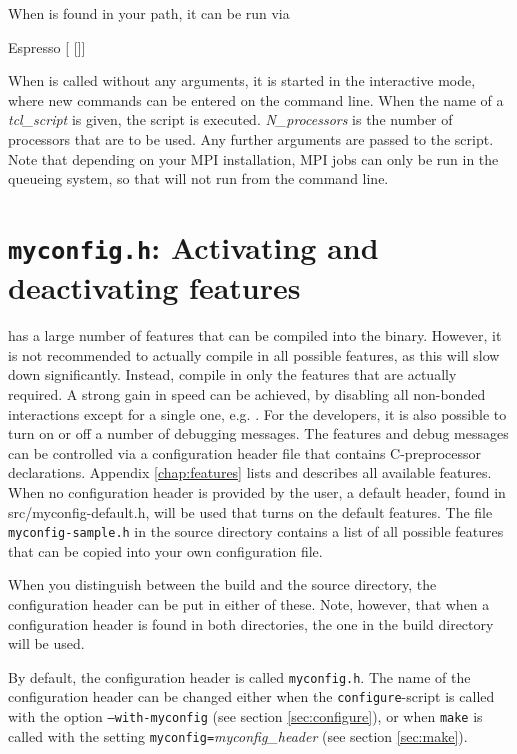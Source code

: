 When \es is found in your path, it can be run via
\begin{code}
Espresso [ []]
\end{code}

 When \es{} is called without any arguments,
it is started in the interactive mode, where new commands can be
entered on the command line. When the name of a \textit{tcl\_script}
is given, the script is executed. \textit{N\_processors} is the number
of processors that are to be used. Any further arguments are passed to
the script. Note that depending on your MPI installation, MPI jobs can
only be run in the queueing system, so that \es will not run from
the command line.


\section{\texttt{myconfig.h}: Activating and deactivating features}
\label{sec:myconfig}

   \es
has a large number of features that can be compiled into the binary.
However, it is not recommended to actually compile in all possible
features, as this will slow down \es significantly.  Instead, compile
in only the features that are actually required.  A strong gain in
speed can be achieved, by disabling all non-bonded interactions except
for a single one, e.g. .  For the developers,
it is also possible to turn on or off a number of debugging messages.
The features and debug messages can be controlled via a configuration
header file that contains C-preprocessor declarations. Appendix
\vref{chap:features} lists and describes all available features.  When
no configuration header is provided by the user, a default header,
found in src/myconfig-default.h, will be used that turns on the
default features.  The file \texttt{myconfig-sample.h} in the source
directory contains a list of all possible features that can be copied
into your own configuration file.

When you distinguish between the build and the source directory, the
configuration header can be put in either of these. Note, however,
that when a configuration header is found in both directories, the one
in the build directory will be used.

By default, the configuration header is called \texttt{myconfig.h}.
The name of the configuration header can be changed either when the
\texttt{configure}-script is called with the option
\mbox{\texttt{--with-myconfig}} (see section \vref{sec:configure}), or
when \texttt{make} is called with the setting
\mbox{\texttt{myconfig=}\textit{myconfig\_header}} (see section
\vref{sec:make}).

